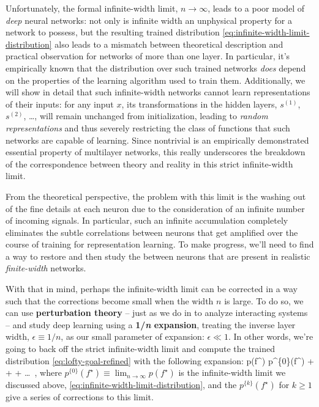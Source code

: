 Unfortunately, the formal infinite-width limit, $n \to \infty$, leads to a poor model of \emph{deep} neural networks: not only is infinite width an unphysical property for a network to possess, but the resulting trained distribution \eqref{eq:infinite-width-limit-distribution} also leads to a mismatch between theoretical description and practical observation for networks of more than one layer. In particular, it's empirically known that the distribution over such trained networks \emph{does} depend on the properties of the learning algorithm used to train them. Additionally, we will show in detail that such infinite-width networks 
cannot learn representations of their inputs:
for any input $x$, its transformations in the hidden layers, $s^{(1)}$, $s^{(2)}$, \ldots, will remain
unchanged from 
initialization, leading to \emph{random representations} and thus severely restricting the class of functions that such networks are capable of learning. Since nontrivial  is an empirically demonstrated essential property of multilayer networks, this really underscores the breakdown of the correspondence between theory and reality in this strict infinite-width limit.

From the theoretical perspective, the problem with this limit is the washing out of the fine details at each neuron due to the consideration of an infinite number of incoming signals. In particular, such an infinite accumulation  completely eliminates the subtle correlations between neurons that get amplified over the course of training for representation learning. To make progress, we'll need to find a way to restore and then study the  between neurons that are present in realistic \emph{finite-width} networks.



With that in mind, perhaps the infinite-width limit can be corrected in a way such that the corrections become small when the width $n$ is large. To do so, we can use \textbf{perturbation theory} -- just as we do in  to analyze interacting systems -- and study deep learning using a \textbf{1/\emph{n} expansion}, treating the inverse layer width, $\epsilon \equiv 1/n$, as our small parameter of expansion: $\epsilon \ll 1$. 
In other words, we're going to back off the strict infinite-width limit and compute the trained distribution \eqref{eq:lofty-goal-refined} with the following expansion:
\be\label{eq:finite-width-limit-distribution}
p(f^\star) \equiv p^{\{0\}}(f^\star) +  +  + \dots \, ,
\ee
where $p^{\{0\}}(f^\star) \equiv \lim_{n\to \infty} p (f^\star)$ is the infinite-width limit we discussed above, \eqref{eq:infinite-width-limit-distribution}, and the $p^{\{k\}}(f^\star)$ for $k \geq 1 $ give a series of corrections to this limit. 

